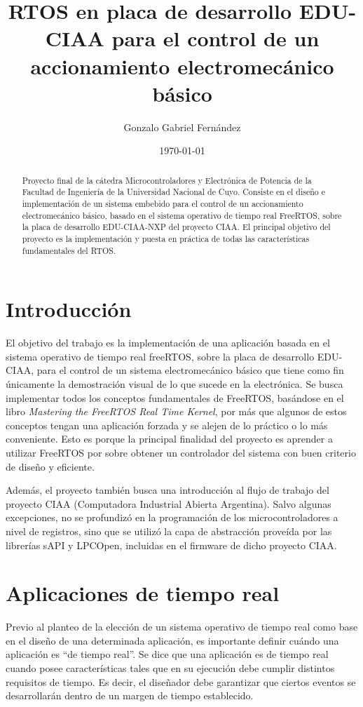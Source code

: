\documentclass{IEEEtran}
\title{RTOS en placa de desarrollo EDU-CIAA para el control de un accionamiento electromecánico básico}
\author{Gonzalo Gabriel Fernández}
\date{\today}
\begin{document}
\maketitle

\begin{abstract}
    Proyecto final de la cátedra Microcontroladores y Electrónica de Potencia de la Facultad de Ingeniería de la Universidad Nacional de Cuyo. Consiste en el diseño e implementación de un sistema embebido para el control de un accionamiento electromecánico básico, basado en el sistema operativo de tiempo real FreeRTOS, sobre la placa de desarrollo EDU-CIAA-NXP del proyecto CIAA. El principal objetivo del proyecto es la implementación y puesta en práctica de todas las características fundamentales del RTOS.
\end{abstract}

\section{Introducción}
El objetivo del trabajo es la implementación de una aplicación basada en el sistema operativo de tiempo real freeRTOS, sobre la placa de desarrollo EDU-CIAA, para el control de un sistema electromecánico básico que tiene como fin únicamente la demostración visual de lo que sucede en la electrónica. Se busca implementar todos los conceptos fundamentales de FreeRTOS, basándose en el libro \textit{Mastering the FreeRTOS Real Time Kernel}\cite{FreeRTOS}, por más que algunos de estos conceptos tengan una aplicación forzada y se alejen de lo práctico o lo más conveniente. Esto es porque la principal finalidad del proyecto es aprender a utilizar FreeRTOS por sobre obtener un controlador del sistema con buen criterio de diseño y eficiente.

Además, el proyecto también busca una introducción al flujo de trabajo del proyecto CIAA (Computadora Industrial Abierta Argentina). Salvo algunas excepciones, no se profundizó en la programación de los microcontroladores a nivel de registros, sino que se utilizó la capa de abstracción proveída por las librerías sAPI y LPCOpen, incluidas en el firmware de dicho proyecto CIAA.

\section{Aplicaciones de tiempo real}
Previo al planteo de la elección de un sistema operativo de tiempo real como base en el diseño de una determinada aplicación, es importante definir cuándo una aplicación es ``de tiempo real''. Se dice que una aplicación es de tiempo real cuando posee características tales que en su ejecución debe cumplir distintos requisitos de tiempo. Es decir, el diseñador debe garantizar que ciertos eventos se desarrollarán dentro de un margen de tiempo establecido.
\end{document}
